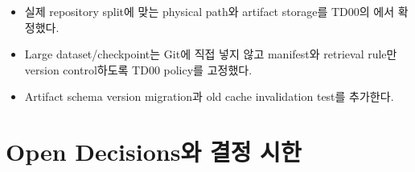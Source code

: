 \documentclass[10pt,a4paper]{article}
\newcommand{\todo}{\textcolor{TodoGray}{\(\square\)}}
\newcommand{\done}{\textcolor{DoneGreen}{\(\boxtimes\)}}
\begin{document}
\begin{itemize}
  \item[\done] 실제 repository split에 맞는 physical path와 artifact storage를 TD00의 에서 확정했다.
  \item[\done] Large dataset/checkpoint는 Git에 직접 넣지 않고 manifest와 retrieval rule만 version control하도록 TD00 policy를 고정했다.
  \item[\todo] Artifact schema version migration과 old cache invalidation test를 추가한다.
\end{itemize}

\section{Open Decisions와 결정 시한}
\end{document}
